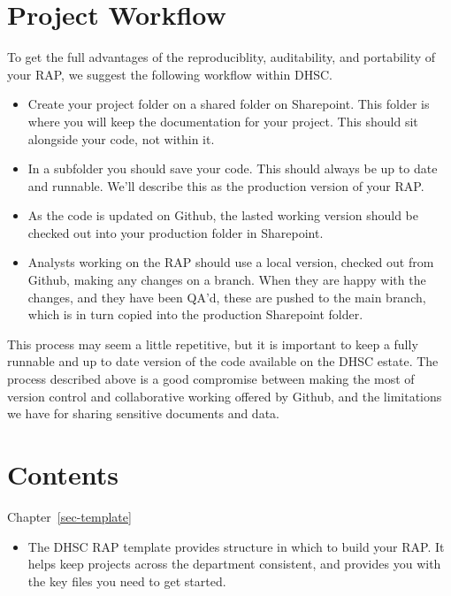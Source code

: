 \documentclass[
  letterpaper,
]{book}
\providecommand{\tightlist}{%
  \setlength{\itemsep}{0pt}\setlength{\parskip}{0pt}}\usepackage{longtable,booktabs,array}
\begin{document}

\hypertarget{project-workflow}{%
\chapter{Project Workflow}\label{project-workflow}}

To get the full advantages of the reproduciblity, auditability, and
portability of your RAP, we suggest the following workflow within DHSC.

\begin{itemize}
\item
  Create your project folder on a shared folder on Sharepoint. This
  folder is where you will keep the documentation for your project. This
  should sit alongside your code, not within it.
\item
  In a subfolder you should save your code. This should always be up to
  date and runnable. We'll describe this as the production version of
  your RAP.
\item
  As the code is updated on Github, the lasted working version should be
  checked out into your production folder in Sharepoint.
\item
  Analysts working on the RAP should use a local version, checked out
  from Github, making any changes on a branch. When they are happy with
  the changes, and they have been QA'd, these are pushed to the main
  branch, which is in turn copied into the production Sharepoint folder.
\end{itemize}

This process may seem a little repetitive, but it is important to keep a
fully runnable and up to date version of the code available on the DHSC
estate. The process described above is a good compromise between making
the most of version control and collaborative working offered by Github,
and the limitations we have for sharing sensitive documents and data.


\hypertarget{contents}{%
\chapter{Contents}\label{contents}}

Chapter~\ref{sec-template}

\begin{itemize}
\tightlist
\item
  The DHSC RAP template provides structure in which to build your RAP.
  It helps keep projects across the department consistent, and provides
  you with the key files you need to get started.
\end{itemize}
\end{document}

